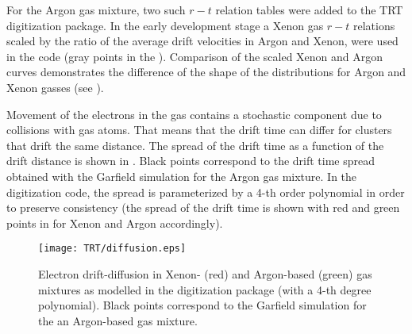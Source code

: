 For the Argon gas mixture, two such $r-t$ relation tables were added to the TRT digitization package.
In the early development stage a Xenon gas $r-t$ relations scaled by the ratio of the average drift velocities in Argon and Xenon, were used in the code 
(gray points in the ). 
Comparison of the scaled Xenon and Argon curves demonstrates the difference of the shape of the distributions for Argon and Xenon gasses (see ).


Movement of the electrons in the gas contains a stochastic component due to collisions with gas atoms. 
That means that the drift time can differ for clusters that drift the same distance.
The spread of the drift time as a function of the drift distance is shown in .
Black points correspond to the drift time spread obtained with the Garfield simulation for the Argon gas mixture.
In the digitization code, the spread is parameterized by a 4-th order polynomial
in order to preserve consistency (the spread of the drift time is shown with red and green points in  for Xenon and Argon accordingly).

\begin{figure}
\begin{center}
\texttt{[image: TRT/diffusion.eps]}
\caption{Electron drift-diffusion in Xenon- (red) and Argon-based (green) gas mixtures as modelled in the digitization package (with a 4-th degree polynomial). 
Black points correspond to the Garfield simulation for the an Argon-based gas mixture.}
\label{fig:diffusion}
\end{center}
\end{figure}


